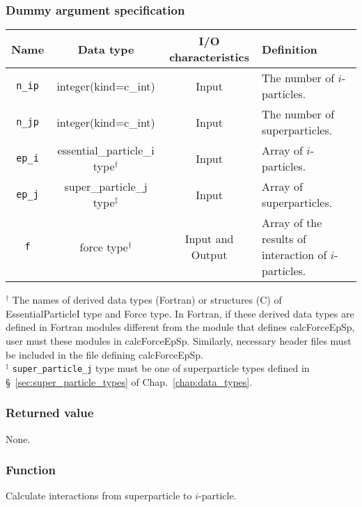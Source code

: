 \subsubsection*{Dummy argument specification}
\begin{table}[H]
\begin{tabularx}{\linewidth}{cccX}
\toprule
\rowcolor{Snow2}
Name & Data type & I/O characteristics & Definition \\
\midrule
\texttt{n\_ip} & integer(kind=c\_int) & Input & The number of $i$-particles. \\
\texttt{n\_jp} & integer(kind=c\_int) & Input & The number of superparticles. \\
\texttt{ep\_i} & essential\_particle\_i type$^{\dagger}$ & Input & Array of $i$-particles. \\
\texttt{ep\_j} & super\_particle\_j type$^{\ddagger}$ & Input & Array of superparticles.\\
\texttt{f} & force type$^{\dagger}$ & Input and Output & Array of the results of interaction of $i$-particles. \\
\bottomrule
\end{tabularx}
\begin{flushleft}
$^{\dagger}$ The names of derived data types {\small (Fortran)} or structures {\small (C)} of EssentialParticleI type and Force type. In Fortran, if these derived data types are defined in Fortran modules different from the module that defines calcForceEpSp, user must  these modules in calcForceEpSp. Similarly, necessary header files must be included in the file defining calcForceEpSp. \\
$^{\ddagger}$ \texttt{super\_particle\_j} type must be one of superparticle types defined in \S~\ref{sec:super_particle_types} of Chap.~\ref{chap:data_types}.
\end{flushleft}
\end{table}


\subsubsection*{Returned value}
None.

\subsubsection*{Function}
Calculate interactions from superparticle to $i$-particle.

